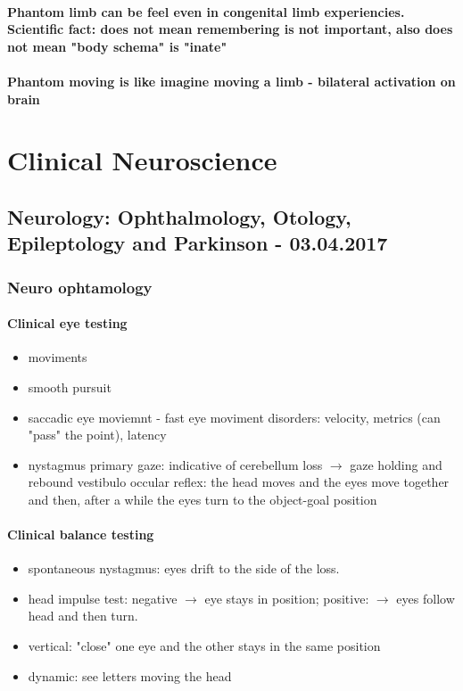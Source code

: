 \documentclass[12pt,article,oneside,a4paper]{memoir}
\begin{document}
\paragraph{Phantom limb can be feel even in congenital limb experiencies. Scientific fact: does not mean remembering is not important, also does not mean "body schema" is "inate"}
\paragraph{Phantom moving is like imagine moving a limb - bilateral activation on brain}

\section{Clinical Neuroscience}

\subsection{Neurology: Ophthalmology, Otology, Epileptology and Parkinson - 03.04.2017}
\subsubsection{Neuro ophtamology}
\paragraph{Clinical eye testing}  
\begin{itemize}
\item moviments
\item smooth pursuit
\item saccadic eye moviemnt - fast eye moviment
\subitem disorders: velocity, metrics (can "pass" the point), latency
\item nystagmus
\subitem primary gaze: indicative of cerebellum loss $\rightarrow$ gaze holding and rebound
\subitem vestibulo occular reflex: the head moves and the eyes move together and then, after a while the eyes turn to the object-goal position
\end{itemize}

\paragraph{Clinical balance testing}
\begin{itemize}
\item spontaneous nystagmus: eyes drift to the side of the loss.
\item head impulse test: negative $\rightarrow$ eye stays in position; positive: $\rightarrow$ eyes follow head and then turn.
\item vertical: "close" one eye and the other stays in the same position
\item dynamic: see letters moving the head
\end{itemize}
\end{document}
